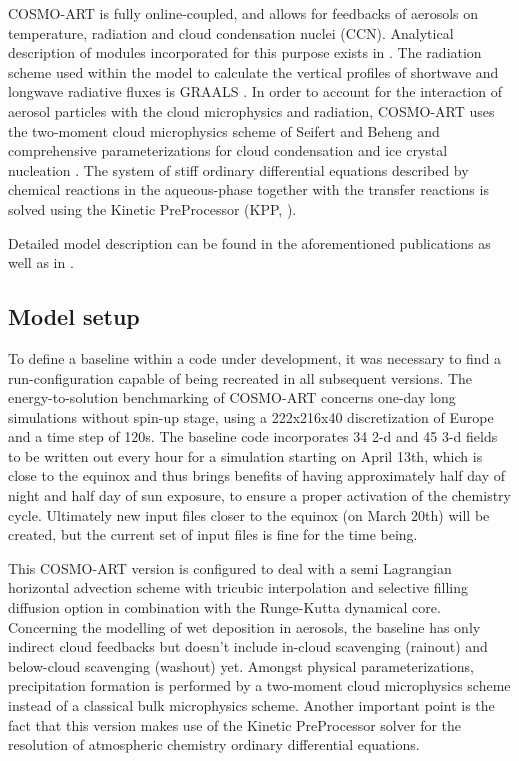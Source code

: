COSMO-ART  is  fully  online-coupled,  and  allows  for  feedbacks  of
aerosols  on  temperature,  radiation  and cloud  condensation  nuclei
(CCN).   Analytical  description  of  modules  incorporated  for  this
purpose  exists in  \citep{Vogel-2009,  Bangert-2011}.  The  radiation
scheme used  within the  model to calculate  the vertical  profiles of
shortwave and longwave radiative fluxes is GRAALS \citep{Ritter-1992}.
In order to account for  the interaction of aerosol particles with the
cloud microphysics and radiation,  COSMO-ART uses the two-moment cloud
microphysics  scheme of  Seifert and  Beheng  \citep{Seifert-2006} and
comprehensive parameterizations for cloud condensation and ice crystal
nucleation  \citep{Bangert-2011, Bangert-2012}.   The system  of stiff
ordinary differential equations described by chemical reactions in the
aqueous-phase together with the transfer reactions is solved using the
Kinetic PreProcessor (KPP, \citealp{Damian-2002}).

Detailed  model  description  can   be  found  in  the  aforementioned
publications  as   well  as  in   \citep{Stanelle-2010,  Bangert-2012,
  Knote-2011, Knote-2013}.

\subsection{Model setup}
\label{subsec:1.2}
To define a baseline within a code under development, it was necessary
to  find  a  run-configuration  capable  of  being  recreated  in  all
subsequent versions. The  energy-to-solution benchmarking of COSMO-ART
concerns  one-day  long simulations  without  spin-up  stage, using  a
222x216x40  discretization of  Europe and  a  time step  of 120s.  The
baseline code incorporates 34 2-d and  45 3-d fields to be written out
every hour for a simulation starting  on April 13th, which is close to
the equinox and thus brings  benefits of having approximately half day
of night and  half day of sun exposure, to  ensure a proper activation
of  the chemistry  cycle. Ultimately  new  input files  closer to  the
equinox (on March 20th) will be  created, but the current set of input
files is fine for the time being.

This COSMO-ART  version is configured  to deal with a  semi Lagrangian
horizontal advection scheme  with tricubic interpolation and selective
filling diffusion option in combination with the Runge-Kutta dynamical
core.   Concerning the modelling  of wet  deposition in  aerosols, the
baseline  has  only  indirect  cloud  feedbacks  but  doesn't  include
in-cloud  scavenging (rainout)  and  below-cloud scavenging  (washout)
yet.  Amongst  physical parameterizations, precipitation  formation is
performed  by a  two-moment  cloud microphysics  scheme  instead of  a
classical  bulk microphysics  scheme. Another  important point  is the
fact that  this version makes  use of the Kinetic  PreProcessor solver
for  the  resolution of  atmospheric  chemistry ordinary  differential
equations.

